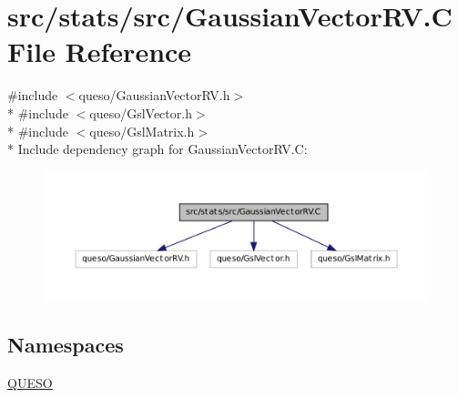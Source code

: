 \hypertarget{_gaussian_vector_r_v_8_c}{\section{src/stats/src/\-Gaussian\-Vector\-R\-V.C File Reference}
\label{_gaussian_vector_r_v_8_c}
}
{\ttfamily \#include $<$queso/\-Gaussian\-Vector\-R\-V.\-h$>$}\\*
{\ttfamily \#include $<$queso/\-Gsl\-Vector.\-h$>$}\\*
{\ttfamily \#include $<$queso/\-Gsl\-Matrix.\-h$>$}\\*
Include dependency graph for Gaussian\-Vector\-R\-V.\-C\-:
\nopagebreak
\begin{figure}[H]
\begin{center}
\leavevmode
\includegraphics[width=350pt]{_gaussian_vector_r_v_8_c__incl}
\end{center}
\end{figure}
\subsection*{Namespaces}
\begin{DoxyCompactItemize}
\item 
\hyperlink{namespace_q_u_e_s_o}{Q\-U\-E\-S\-O}
\end{DoxyCompactItemize}
